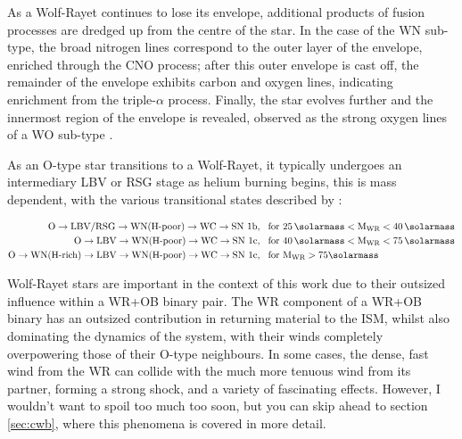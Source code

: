 As a Wolf-Rayet continues to lose its envelope, additional products of fusion processes are dredged up from the centre of the star.
In the case of the WN sub-type, the broad nitrogen lines correspond to the outer layer of the envelope, enriched through the CNO process; after this outer envelope is cast off, the remainder of the envelope exhibits carbon and oxygen lines, indicating enrichment from the triple-$\alpha$ process.
Finally, the star evolves further and the innermost region of the envelope is revealed, observed as the strong oxygen lines of a WO sub-type \parencite{neugentWolfRayetContent2019,oswaltPlanetsStarsStellar2013}.


As an O-type star transitions to a Wolf-Rayet, it typically undergoes an intermediary LBV or RSG stage as helium burning begins, this is mass dependent, with the various transitional states described by \cite{crowther_physical_2007}:

\begin{subequations}
  \begin{align*}
    \text{O} \rightarrow \text{LBV/RSG} \rightarrow \text{WN(H-poor)} \rightarrow \text{WC} \rightarrow \text{SN 1b} & ,~~ \text{for } 25 \, \si{\solarmass} < \text{M}_{\text{WR}} < 40 \, \si{\solarmass} \\
    \text{O} \rightarrow \text{LBV} \rightarrow \text{WN(H-poor)} \rightarrow \text{WC} \rightarrow \text{SN 1c} & ,~~ \text{for } 40 \, \si{\solarmass} < \text{M}_{\text{WR}} < 75 \, \si{\solarmass} \\
    \text{O} \rightarrow \text{WN(H-rich)} \rightarrow \text{LBV} \rightarrow \text{WN(H-poor)} \rightarrow \text{WC} \rightarrow \text{SN 1c} & ,~~ \text{for } \text{M}_{\text{WR}} > 75 \si{\solarmass} 
  \end{align*}  
\end{subequations}




Wolf-Rayet stars are important in the context of this work due to their outsized influence within a WR+OB binary pair.
The WR component of a WR+OB binary has an outsized contribution in returning material to the ISM, whilst also dominating the dynamics of the system, with their winds completely overpowering those of their O-type neighbours.
In some cases, the dense, fast wind from the WR can collide with the much more tenuous wind from its partner, forming a strong shock, and a variety of fascinating effects.
However, I wouldn't want to spoil too much too soon, but you can skip ahead to section \ref{sec:cwb}, where this phenomena is covered in more detail.



